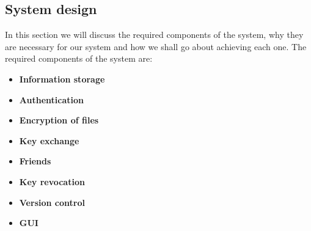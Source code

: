 \documentclass[12pt, titlepage]{article}
\begin{document}
\subsection{System design}
In this section we will discuss the required components of the system, why they are necessary for our system and how we shall go about achieving each one. The required components of the system are:
\begin{itemize}
	\item \textbf{Information storage}
	\item \textbf{Authentication}
	\item \textbf{Encryption of files}
	\item \textbf{Key exchange}
	\item \textbf{Friends}
	\item \textbf{Key revocation}
	\item \textbf{Version control}
	\item \textbf{GUI}
\end{itemize}
\end{document}
